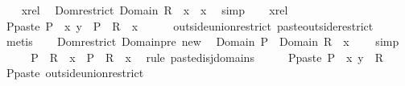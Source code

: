 \begin{isabellebody}
\ \ \isamarkupfalse%
\ x{\isacharunderscore}rel\ \isamarkupfalse%
\ Dom{\isacharunderscore}restrict{\isacharcolon}\ {\isachardoublequoteopen}Domain\ {\isacharparenleft}R\ {\isacharbar}{\isacharbar}\ {\isacharbraceleft}x{\isacharbraceright}{\isacharparenright}\ {\isacharequal}\ {\isacharbraceleft}x{\isacharbraceright}{\isachardoublequoteclose}\ \isamarkupfalse%
\ simp\isanewline
\ \ \isamarkupfalse%
\ x{\isacharunderscore}rel\ \isamarkupfalse%
\ P{\isacharunderscore}paste{\isacharprime}{\isacharcolon}\ {\isachardoublequoteopen}{\isacharquery}P\ {\isacharplus}{\isacharasterisk}\ {\isacharbraceleft}{\isacharparenleft}x{\isacharcomma}\ y{\isacharparenright}{\isacharbraceright}\ {\isacharequal}\ {\isacharquery}P\ {\isasymunion}\ R\ {\isacharbar}{\isacharbar}\ {\isacharbraceleft}x{\isacharbraceright}{\isachardoublequoteclose}\isanewline
\ \ \ \ \isamarkupfalse%
\ outside{\isacharunderscore}union{\isacharunderscore}restrict\ paste{\isacharunderscore}outside{\isacharunderscore}restrict\ \isamarkupfalse%
\ metis\isanewline
\ \ \isamarkupfalse%
\ Dom{\isacharunderscore}restrict\ Domain{\isacharunderscore}pre\ new\ \isamarkupfalse%
\ {\isachardoublequoteopen}Domain\ {\isacharquery}P\ {\isasyminter}\ Domain\ {\isacharparenleft}R\ {\isacharbar}{\isacharbar}\ {\isacharbraceleft}x{\isacharbraceright}{\isacharparenright}\ {\isacharequal}\ {\isacharbraceleft}{\isacharbraceright}{\isachardoublequoteclose}\ \isamarkupfalse%
\ simp\isanewline
\ \ \isamarkupfalse%
\ \isamarkupfalse%
\ {\isachardoublequoteopen}{\isacharquery}P\ {\isacharplus}{\isacharasterisk}\ {\isacharparenleft}R\ {\isacharbar}{\isacharbar}\ {\isacharbraceleft}x{\isacharbraceright}{\isacharparenright}\ {\isacharequal}\ {\isacharquery}P\ {\isasymunion}\ {\isacharparenleft}R\ {\isacharbar}{\isacharbar}\ {\isacharbraceleft}x{\isacharbraceright}{\isacharparenright}{\isachardoublequoteclose}\ \isamarkupfalse%
\ {\isacharparenleft}rule\ paste{\isacharunderscore}disj{\isacharunderscore}domains{\isacharparenright}\isanewline
\ \ \isamarkupfalse%
\ \isamarkupfalse%
\ P{\isacharunderscore}paste{\isacharcolon}\ {\isachardoublequoteopen}{\isacharquery}P\ {\isacharplus}{\isacharasterisk}\ {\isacharbraceleft}{\isacharparenleft}x{\isacharcomma}\ y{\isacharparenright}{\isacharbraceright}\ {\isacharequal}\ R{\isachardoublequoteclose}\ \isamarkupfalse%
\ P{\isacharunderscore}paste{\isacharprime}\ outside{\isacharunderscore}union{\isacharunderscore}restrict\ \isamarkupfalse%

\end{isabellebody}
